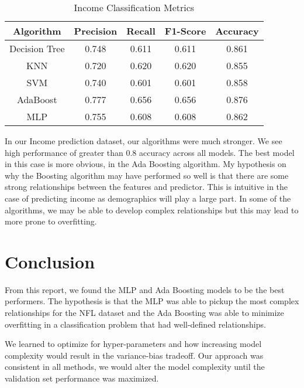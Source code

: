 \documentclass[12pt]{article}
\begin{document}
\begin{table}[H]
\caption{Income Classification Metrics}
\centering
\begin{tabular}{|c|c|c|c|c|}
\hline
\textbf{Algorithm} & \textbf{Precision} & \textbf{Recall} & \textbf{F1-Score} & \textbf{Accuracy} \\ \hline
Decision Tree & 0.748 & 0.611 & 0.611 & 0.861 \\ \hline
KNN & 0.720 & 0.620 & 0.620 & 0.855 \\ \hline
SVM & 0.740 & 0.601 & 0.601 & 0.858 \\ \hline
AdaBoost & 0.777 & 0.656 & 0.656 & 0.876 \\ \hline
MLP & 0.755 & 0.608 & 0.608 & 0.862 \\ \hline
\end{tabular}
\end{table}

In our Income prediction dataset, our algorithms were much stronger. We see high performance of greater than 0.8 accuracy across all models. The best model in this case is more obvious, in the Ada Boosting algorithm.  My hypothesis on why the Boosting algorithm may have performed so well is that there are some strong relationships between the features and predictor. This is intuitive in the case of predicting income as demographics will play a large part. In some of the algorithms, we may be able to develop complex relationships but this may lead to more prone to overfitting.

\section{Conclusion}
From this report, we found the MLP and Ada Boosting models to be the best performers. The hypothesis is that the MLP was able to pickup the most complex relationships for the NFL dataset and the Ada Boosting was able to minimize overfitting in a classification problem that had well-defined relationships.

We learned to optimize for hyper-parameters and how increasing model complexity would result in the variance-bias tradeoff. Our approach was consistent in all methods, we would alter the model complexity until the validation set performance was maximized.
\end{document}
